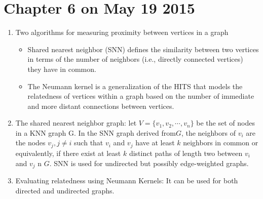 \documentclass[14pt]{article}
\begin{document}
\section{Chapter 6 on May 19 2015}
\begin{enumerate}
 \item Two algorithms for measuring proximity between vertices in a graph
  \begin{itemize}
   \item Shared nearest neighbor (SNN) defines the similarity between two vertices in terms of the number of neighbors (i.e., directly connected vertices) they have in common.
   \item The Neumann kernel is a generalization of the HITS that models the relatedness of vertices within a graph based on the number of immediate and more distant connections between vertices.
  \end{itemize}
  
  \item The shared nearest neighbor graph: let $V= \{ v_1, v_2, \cdots, v_n \}$ be the set of nodes in a KNN graph G. In the SNN graph derived from$G$, the neighbors of $v_i$ are the nodes $v_j, j \neq i$ such that $v_i$ and $v_j$ have at least $k$ neighbors in common or equivalently, if there exist at least $k$ distinct paths of length two between $v_i$ and $v_j$ n $G$. SNN is used for undirected but possibly edge-weighted graphs.
  
  \item Evaluating relatedness using Neumann Kernels: It can be used for both directed and undirected graphs. 
\end{enumerate}
\end{document}
